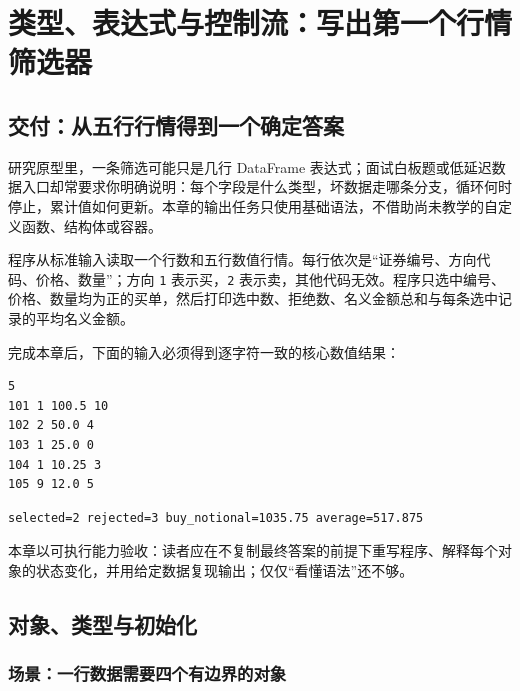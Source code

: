 \chapter{类型、表达式与控制流：写出第一个行情筛选器}


\section{交付：从五行行情得到一个确定答案}

研究原型里，一条筛选可能只是几行 DataFrame 表达式；面试白板题或低延迟数据入口却常要求你明确说明：每个字段是什么类型，坏数据走哪条分支，循环何时停止，累计值如何更新。本章的输出任务只使用基础语法，不借助尚未教学的自定义函数、结构体或容器。

程序从标准输入读取一个行数和五行数值行情。每行依次是“证券编号、方向代码、价格、数量”；方向 \texttt{1} 表示买，\texttt{2} 表示卖，其他代码无效。程序只选中编号、价格、数量均为正的买单，然后打印选中数、拒绝数、名义金额总和与每条选中记录的平均名义金额。

完成本章后，下面的输入必须得到逐字符一致的核心数值结果：

\begin{lstlisting}[numbers=none]
5
101 1 100.5 10
102 2 50.0 4
103 1 25.0 0
104 1 10.25 3
105 9 12.0 5
\end{lstlisting}

\begin{lstlisting}[numbers=none]
selected=2 rejected=3 buy_notional=1035.75 average=517.875
\end{lstlisting}

本章以可执行能力验收：读者应在不复制最终答案的前提下重写程序、解释每个对象的状态变化，并用给定数据复现输出；仅仅“看懂语法”还不够。

\section{对象、类型与初始化}

\subsection{场景：一行数据需要四个有边界的对象}

